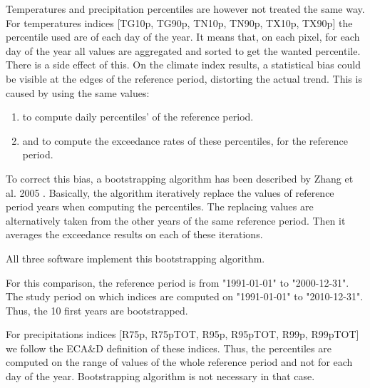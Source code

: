 \documentclass[a4paper,11pt]{article}
\begin{document}
        Temperatures and precipitation percentiles are however not treated the same way. 
        For temperatures indices [TG10p, TG90p, TN10p, TN90p, TX10p, TX90p] the percentile used are of each day of the year. It means that, on each pixel, for each day of the year all values are aggregated and sorted to get the wanted percentile. 
        There is a side effect of this. On the climate index results, a statistical bias could be visible at the edges of the reference period, distorting the actual trend.
        This is caused by using the same values:
        \begin{enumerate}
            \item to compute daily percentiles' of the reference period.
            \item and to compute the exceedance rates of these percentiles, for the reference period.
        \end{enumerate}
        To correct this bias, a bootstrapping algorithm has been described by Zhang et al. 2005 \cite{quote/zhang_et_al}.
        Basically, the algorithm iteratively replace the values of reference period years when computing the percentiles.
        The replacing values are alternatively taken from the other years of the same reference period.
        Then it averages the exceedance results on each of these iterations.

        All three software implement this bootstrapping algorithm.

        For this comparison, the reference period is from "1991-01-01" to "2000-12-31".
        The study period on which indices are computed on "1991-01-01" to "2010-12-31".
        Thus, the 10 first years are bootstrapped.

        For precipitations indices [R75p, R75pTOT, R95p, R95pTOT, R99p, R99pTOT] we follow the ECA\&D definition of these indices.
        Thus, the percentiles are computed on the range of values of the whole reference period and not for each day of the year.
        Bootstrapping algorithm is not necessary in that case.
\end{document}
